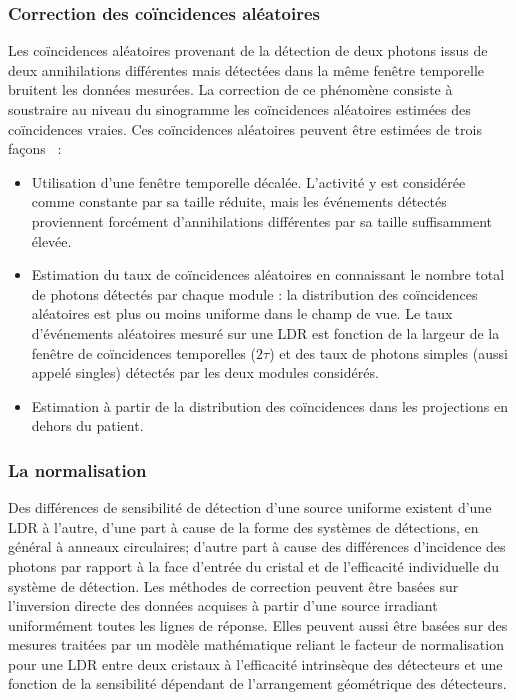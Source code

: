 \subsubsection{Correction des coïncidences aléatoires}
Les coïncidences aléatoires provenant de la détection de deux photons issus de deux annihilations différentes mais détectées dans la même fenêtre temporelle bruitent les données mesurées. La correction de ce phénomène consiste à soustraire au niveau du sinogramme les coïncidences aléatoires estimées des coïncidences vraies. Ces coïncidences aléatoires peuvent être estimées de trois façons~\cite{brasse2005correction} :

\begin{itemize}
\item Utilisation d'une fenêtre temporelle décalée. L’activité y est considérée comme constante par sa taille réduite, mais les événements détectés proviennent forcément d’annihilations différentes par sa taille suffisamment élevée.
\item Estimation du taux de coïncidences aléatoires en connaissant le nombre total de photons détectés par chaque module : la distribution des coïncidences aléatoires est plus ou moins uniforme dans le champ de vue. Le taux d’événements aléatoires mesuré sur une LDR est fonction de la largeur de la fenêtre de coïncidences temporelles ($2\tau$) et des taux de photons simples (aussi appelé singles) détectés par les deux modules considérés.
\item Estimation à partir de la distribution des coïncidences dans les projections en dehors du patient.
\end{itemize}


\subsubsection{La normalisation}

Des différences de sensibilité de détection d’une source uniforme existent d’une LDR à l’autre, d’une part à cause de la forme des systèmes de détections, en général à anneaux circulaires; d’autre part à cause des différences d’incidence des photons par rapport à la face d’entrée du cristal et de l’efficacité individuelle du système de détection. Les méthodes de correction peuvent être basées sur l’inversion directe des données acquises à partir d’une source irradiant uniformément toutes les lignes de réponse. Elles peuvent aussi être basées sur des mesures traitées par un modèle mathématique reliant le facteur de normalisation pour une LDR entre deux cristaux à l’efficacité intrinsèque des détecteurs et une fonction de la sensibilité dépendant de l’arrangement géométrique des détecteurs.



